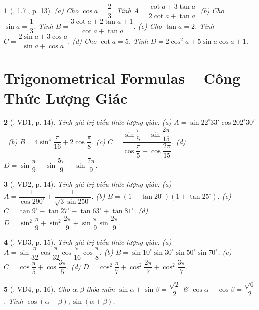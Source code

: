 \documentclass{article}
\newtheorem{baitoan}{}
\begin{document}
\begin{baitoan}[\cite{Hung_nang_cao_phat_trien_Toan_11_tap_1}, 1.7., p. 13]
	(a) Cho $\cos a = \dfrac{2}{3}$. Tính $A = \dfrac{\cot a + 3\tan a}{2\cot a + \tan a}$. (b) Cho $\sin a = \dfrac{1}{3}$. Tính $B = \dfrac{3\cot a + 2\tan a + 1}{\cot a + \tan a}$. (c) Cho $\tan a = 2$. Tính $C = \dfrac{2\sin a + 3\cos a}{\sin a + \cos a}$. (d) Cho $\cot a = 5$. Tính $D = 2\cos^2a + 5\sin a\cos a + 1$.
\end{baitoan}


\section{Trigonometrical Formulas -- Công Thức Lượng Giác}

\begin{baitoan}[\cite{Hung_nang_cao_phat_trien_Toan_11_tap_1}, VD1, p. 14]
	Tính giá trị biểu thức lượng giác: (a) $A = \sin22^\circ33'\cos202^\circ30'$. (b) $B = 4\sin^4\dfrac{\pi}{16} + 2\cos\dfrac{\pi}{8}$. (c) $C = \dfrac{\sin\dfrac{\pi}{5} - \sin\dfrac{2\pi}{15}}{\cos\dfrac{\pi}{5} - \cos\dfrac{2\pi}{15}}$. (d) $D = \sin\dfrac{\pi}{9} - \sin\dfrac{5\pi}{9} + \sin\dfrac{7\pi}{9}$.
\end{baitoan}

\begin{baitoan}[\cite{Hung_nang_cao_phat_trien_Toan_11_tap_1},  VD2, p. 14]
	Tính giá trị biểu thức lượng giác: (a) $A = \dfrac{1}{\cos290^\circ} + \dfrac{1}{\sqrt{3}\sin250^\circ}$. (b) $B = (1 + \tan20^\circ)(1 + \tan25^\circ)$. (c) $C = \tan9^\circ - \tan27^\circ - \tan63^\circ + \tan81^\circ$. (d) $D = \sin^2\dfrac{\pi}{9} + \sin^2\dfrac{2\pi}{9} + \sin\dfrac{\pi}{9}\sin\dfrac{2\pi}{9}$. 
\end{baitoan}

\begin{baitoan}[\cite{Hung_nang_cao_phat_trien_Toan_11_tap_1}, VD3, p. 15]
	Tính giá trị biểu thức lượng giác: (a) $A = \sin\dfrac{\pi}{32}\cos\dfrac{\pi}{32}\cos\dfrac{\pi}{16}\cos\dfrac{\pi}{8}$. (b) $B = \sin10^\circ\sin30^\circ\sin50^\circ\sin70^\circ$. (c) $C = \cos\dfrac{\pi}{5} + \cos\dfrac{3\pi}{5}$. (d) $D = \cos^2\dfrac{\pi}{7} + \cos^2\dfrac{2\pi}{7} + \cos^2\dfrac{3\pi}{7}$.
\end{baitoan}

\begin{baitoan}[\cite{Hung_nang_cao_phat_trien_Toan_11_tap_1}, VD4, p. 16]
	Cho $\alpha,\beta$ thỏa mãn $\sin\alpha + \sin\beta = \dfrac{\sqrt{2}}{2}$ \& $\cos\alpha + \cos\beta = \dfrac{\sqrt{6}}{2}$. Tính $\cos(\alpha - \beta),\sin(\alpha + \beta)$.
\end{baitoan}
\end{document}
